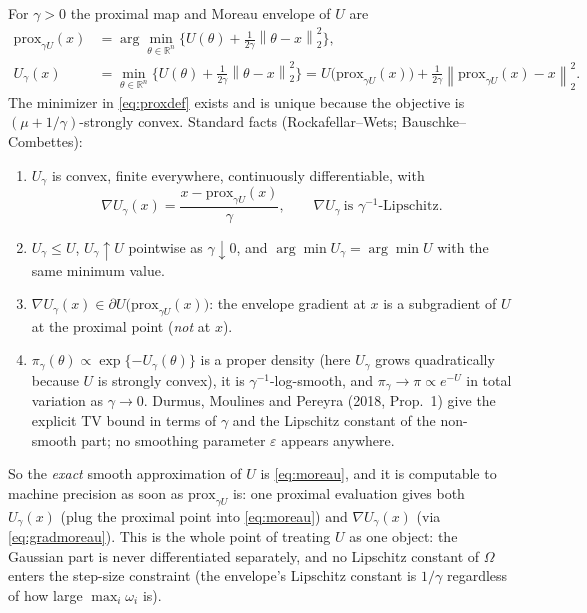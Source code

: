 \documentclass[12pt]{article}
\newcommand{\R}{\mathbb{R}}
\newcommand{\norm}[1]{\left\lVert#1\right\rVert}
\newcommand{\prox}{\mathrm{prox}}
\begin{document}
For $\gamma>0$ the proximal map and Moreau envelope of $U$ are
\begin{align}
    \prox_{\gamma U}(x)&=\arg\min_{\theta\in\R^n}\Big\{U(\theta)+\tfrac1{2\gamma}\norm{\theta-x}_2^2\Big\},
    \label{eq:proxdef}\\
    U_\gamma(x)&=\min_{\theta\in\R^n}\Big\{U(\theta)+\tfrac1{2\gamma}\norm{\theta-x}_2^2\Big\}
    =U\big(\prox_{\gamma U}(x)\big)+\tfrac1{2\gamma}\norm{\prox_{\gamma U}(x)-x}_2^2 .
    \label{eq:moreau}
\end{align}
The minimizer in \eqref{eq:proxdef} exists and is unique because the objective is
$(\mu+1/\gamma)$-strongly convex. Standard facts (Rockafellar--Wets; Bauschke--Combettes):
\begin{enumerate}
\item $U_\gamma$ is convex, finite everywhere, continuously differentiable, with
\begin{equation}
    \nabla U_\gamma(x)=\frac{x-\prox_{\gamma U}(x)}{\gamma},
    \qquad \nabla U_\gamma\ \text{is }\gamma^{-1}\text{-Lipschitz}.
    \label{eq:gradmoreau}
\end{equation}
\item $U_\gamma\le U$, $U_\gamma\uparrow U$ pointwise as $\gamma\downarrow0$, and
$\arg\min U_\gamma=\arg\min U$ with the same minimum value.
\item $\nabla U_\gamma(x)\in\partial U\big(\prox_{\gamma U}(x)\big)$: the envelope gradient at $x$ is a
subgradient of $U$ at the proximal point (\emph{not} at $x$).
\item $\pi_\gamma(\theta)\propto\exp\{-U_\gamma(\theta)\}$ is a proper density (here $U_\gamma$ grows
quadratically because $U$ is strongly convex), it is $\gamma^{-1}$-log-smooth, and
$\pi_\gamma\to\pi\propto e^{-U}$ in total variation as $\gamma\to0$. Durmus, Moulines and Pereyra
(2018, Prop.~1) give the explicit TV bound in terms of $\gamma$ and the Lipschitz constant of the
non-smooth part; no smoothing parameter $\varepsilon$ appears anywhere.
\end{enumerate}
So the \emph{exact} smooth approximation of $U$ is \eqref{eq:moreau}, and it is computable to
machine precision as soon as $\prox_{\gamma U}$ is: one proximal evaluation gives both
$U_\gamma(x)$ (plug the proximal point into \eqref{eq:moreau}) and $\nabla U_\gamma(x)$ (via
\eqref{eq:gradmoreau}). This is the whole point of treating $U$ as one object: the Gaussian
part is never differentiated separately, and no Lipschitz constant of $\Omega$ enters the
step-size constraint (the envelope's Lipschitz constant is $1/\gamma$ regardless of how large
$\max_i\omega_i$ is).
\end{document}
